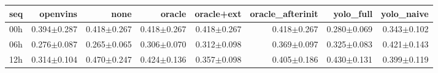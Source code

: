 \begin{tabular}{lrrrrrrr}
\toprule
seq & openvins & none & oracle & oracle+ext & oracle\_afterinit & yolo\_full & yolo\_naive \\
\midrule
00h & 0.394$\pm$0.287 & 0.418$\pm$0.267 & 0.418$\pm$0.267 & 0.418$\pm$0.267 & 0.418$\pm$0.267 & 0.280$\pm$0.069 & 0.343$\pm$0.102 \\
06h & 0.276$\pm$0.087 & 0.265$\pm$0.065 & 0.306$\pm$0.070 & 0.312$\pm$0.098 & 0.369$\pm$0.097 & 0.325$\pm$0.083 & 0.421$\pm$0.143 \\
12h & 0.314$\pm$0.104 & 0.470$\pm$0.247 & 0.424$\pm$0.136 & 0.357$\pm$0.098 & 0.405$\pm$0.186 & 0.430$\pm$0.131 & 0.399$\pm$0.119 \\
\bottomrule
\end{tabular}
